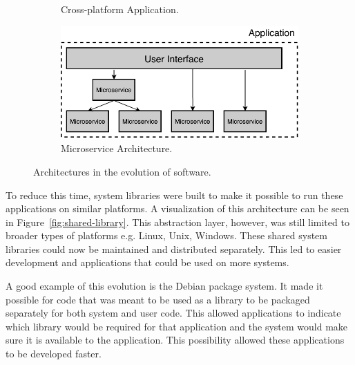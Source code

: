 \begin{figure}[th!]
\begin{subfigure}[t]{.45\textwidth}
		\caption{Cross-platform Application.}
		\label{fig:cross-platform}
	\end{subfigure}%
    \begin{subfigure}[t]{.55\textwidth}
    	\centering
    	\captionsetup{width=.9\linewidth}
    	\includegraphics[width=0.97\linewidth]{images/intro-evolution-microservice2.pdf}
    	\caption{Microservice Architecture.}
    	\label{fig:microservice}
    \end{subfigure}%
	\caption{Architectures in the evolution of software.}
	\label{fig:evolution}
\end{figure}

\newpage

To reduce this time, system libraries were built to make it possible to run these applications on similar platforms. A visualization of this architecture can be seen in Figure~\ref{fig:shared-library}. This abstraction layer, however, was still limited to broader types of platforms e.g. Linux, Unix, Windows. These shared system libraries could now be maintained and distributed separately. This led to easier development and applications that could be used on more systems.

A good example of this evolution is the Debian package system. It made it possible for code that was meant to be used as a library to be packaged separately for both system and user code. This allowed applications to indicate which library would be required for that application and the system would make sure it is available to the application. This possibility allowed these applications to be developed faster. ~\cite{zacchiroli2011debian}


